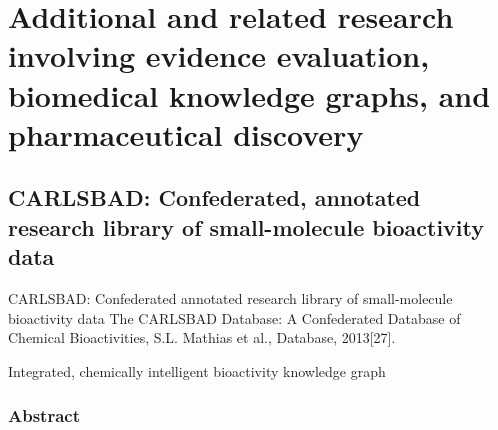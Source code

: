 \chapter{Additional and related research involving evidence evaluation, biomedical knowledge graphs, and pharmaceutical discovery}

\section{CARLSBAD: Confederated, annotated research library of small-molecule bioactivity data}

CARLSBAD: Confederated annotated research library of small-molecule bioactivity data
The CARLSBAD Database: A Confederated Database of Chemical Bioactivities, S.L. Mathias et al., Database, 2013[27].

Integrated, chemically intelligent bioactivity knowledge graph

\subsection{Abstract}

